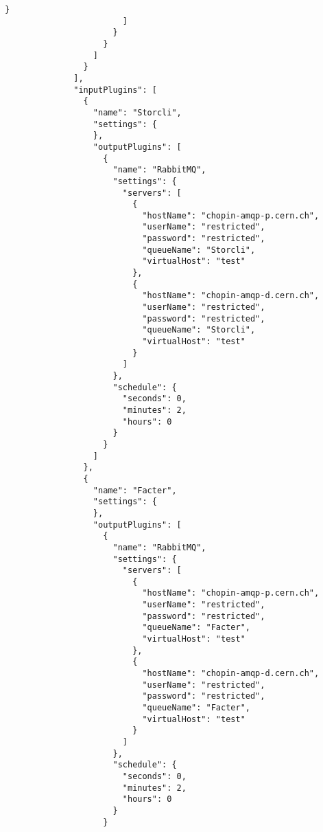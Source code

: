 \begin{lstlisting}[style=csharp, caption=Fichero de configuración]
                          }
                        ]
                      }
                    }
                  ]
                }
              ],
              "inputPlugins": [
                {
                  "name": "Storcli",
                  "settings": {
                  },
                  "outputPlugins": [
                    {
                      "name": "RabbitMQ",
                      "settings": {
                        "servers": [
                          {
                            "hostName": "chopin-amqp-p.cern.ch",
                            "userName": "restricted",
                            "password": "restricted",
                            "queueName": "Storcli",
                            "virtualHost": "test"
                          },
                          {
                            "hostName": "chopin-amqp-d.cern.ch",
                            "userName": "restricted",
                            "password": "restricted",
                            "queueName": "Storcli",
                            "virtualHost": "test"
                          }
                        ]
                      },
                      "schedule": {
                        "seconds": 0,
                        "minutes": 2,
                        "hours": 0
                      }
                    }
                  ]
                },
                {
                  "name": "Facter",
                  "settings": {
                  },
                  "outputPlugins": [
                    {
                      "name": "RabbitMQ",
                      "settings": {
                        "servers": [
                          {
                            "hostName": "chopin-amqp-p.cern.ch",
                            "userName": "restricted",
                            "password": "restricted",
                            "queueName": "Facter",
                            "virtualHost": "test"
                          },
                          {
                            "hostName": "chopin-amqp-d.cern.ch",
                            "userName": "restricted",
                            "password": "restricted",
                            "queueName": "Facter",
                            "virtualHost": "test"
                          }
                        ]
                      },
                      "schedule": {
                        "seconds": 0,
                        "minutes": 2,
                        "hours": 0
                      }
                    }

\end{lstlisting}
